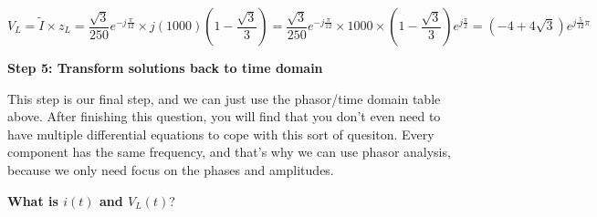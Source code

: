 \begin{enumerate}
{$$V_L=\widetilde{I}{\times}z_L=\frac{\sqrt{3}}{250}e^{-j\frac{\pi}{12}}{\times}j(1000)(1-\frac{\sqrt{3}}{3})=\frac{\sqrt{3}}{250}e^{-j\frac{\pi}{12}}{\times}1000{\times}(1-\frac{\sqrt{3}}{3})e^{j\frac{\pi}{2}}=(-4+4\sqrt{3})e^{j\frac{5}{12}\pi}$$
}

\qitem \textbf{Step 5: Transform solutions back to time domain}

This step is our final step, and we can just use the phasor/time domain table above. After finishing this question, you will find that
you don't even need to have multiple differential equations to cope with this sort of quesiton. Every component has the same frequency, and that's 
why we can use phasor analysis, because we only need focus on the phases and amplitudes. 

\textbf{What is $i(t)$ and $V_{L}(t)$}? 

\ws{\vspace{80px}}


%
%
%
%
%
%
%
%
%
%
%
%
\end{enumerate}
